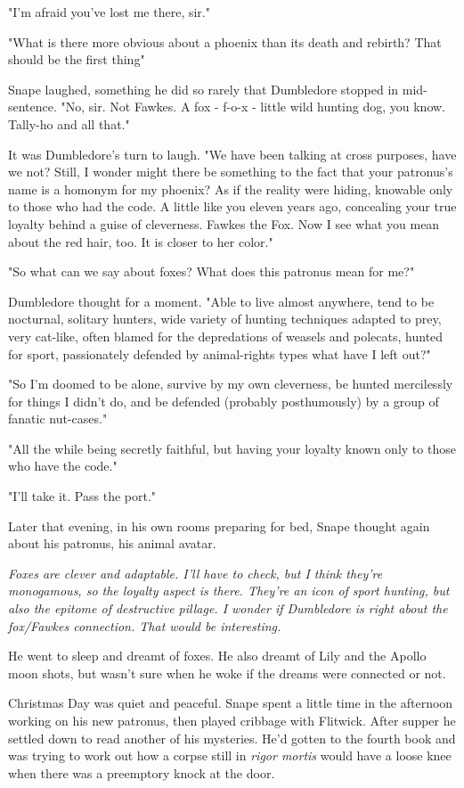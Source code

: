"I'm afraid you've lost me there, sir."

"What is there more obvious about a phoenix than its death and rebirth? That should be the first thing{\el}"

Snape laughed, something he did so rarely that Dumbledore stopped in mid-sentence. "No, sir. Not Fawkes. A fox - f-o-x - little wild hunting dog, you know. Tally-ho and all that."

It was Dumbledore's turn to laugh. "We have been talking at cross purposes, have we not? Still, I wonder{\el} might there be something to the fact that your patronus's name is a homonym for my phoenix? As if the reality were hiding, knowable only to those who had the code. A little like you eleven years ago, concealing your true loyalty behind a guise of cleverness. Fawkes the Fox. Now I see what you mean about the red hair, too. It is closer to her color."

"So what can we say about foxes? What does this patronus mean for me?"

Dumbledore thought for a moment. "Able to live almost anywhere, tend to be nocturnal, solitary hunters, wide variety of hunting techniques adapted to prey, very cat-like, often blamed for the depredations of weasels and polecats, hunted for sport, passionately defended by animal-rights types{\el} what have I left out?"

"So I'm doomed to be alone, survive by my own cleverness, be hunted mercilessly for things I didn't do, and be defended (probably posthumously) by a group of fanatic nut-cases."

"All the while being secretly faithful, but having your loyalty known only to those who have the code."

"I'll take it. Pass the port."

Later that evening, in his own rooms preparing for bed, Snape thought again about his patronus, his animal avatar.

\emph{Foxes are clever and adaptable. I'll have to check, but I think they're monogamous, so the loyalty aspect is there. They're an icon of sport hunting, but also the epitome of destructive pillage. I wonder if Dumbledore is right about the fox\slash Fawkes connection. That would be interesting.}

He went to sleep and dreamt of foxes. He also dreamt of Lily and the Apollo moon shots, but wasn't sure when he woke if the dreams were connected or not.

Christmas Day was quiet and peaceful. Snape spent a little time in the afternoon working on his new patronus, then played cribbage with Flitwick. After supper he settled down to read another of his mysteries. He'd gotten to the fourth book and was trying to work out how a corpse still in \emph{rigor mortis} would have a loose knee when there was a preemptory knock at the door.

